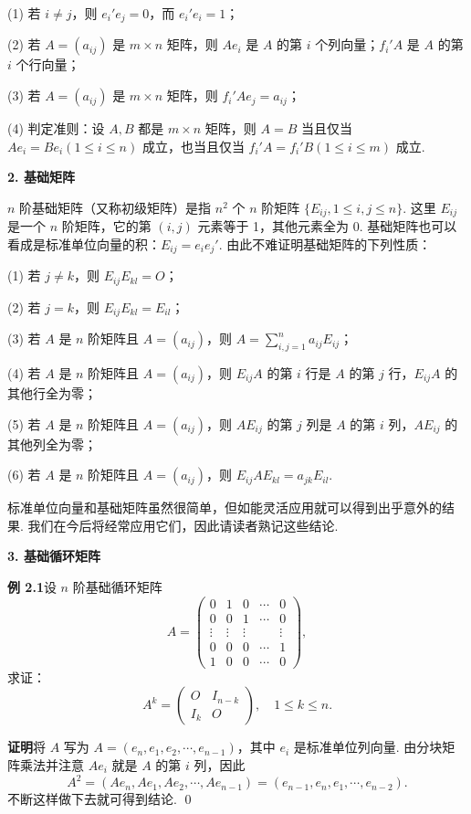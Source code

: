 \documentclass[UTF8,12pt,a4paper,fontset=fandol]{ctexart}
\begin{document}
(1) 若 $i\ne j$，则 $e_i'e_j=0$，而 $e_i'e_i=1$；

(2) 若 $A=(a_{ij})$ 是 $m\times n$ 矩阵，则 $Ae_i$ 是 $A$ 的第 $i$ 个列向量；$f_i'A$ 是 $A$ 的第 $i$ 个行向量；

(3) 若 $A=(a_{ij})$ 是 $m\times n$ 矩阵，则 $f_i'Ae_j=a_{ij}$；

(4) 判定准则：设 $A,B$ 都是 $m\times n$ 矩阵，则 $A=B$ 当且仅当 $Ae_i=Be_i(1\le i\le n)$ 成立，也当且仅当 $f_i'A=f_i'B(1\le i\le m)$ 成立.

\noindent\textbf{2. 基础矩阵}

$n$ 阶基础矩阵（又称初级矩阵）是指 $n^2$ 个 $n$ 阶矩阵 $\{E_{ij},1\le i,j\le n\}$. 这里 $E_{ij}$ 是一个 $n$ 阶矩阵，它的第 $(i,j)$ 元素等于 1，其他元素全为 0. 基础矩阵也可以看成是标准单位向量的积：$E_{ij}=e_ie_j'$. 由此不难证明基础矩阵的下列性质：

(1) 若 $j\ne k$，则 $E_{ij}E_{kl}=O$；

(2) 若 $j=k$，则 $E_{ij}E_{kl}=E_{il}$；

(3) 若 $A$ 是 $n$ 阶矩阵且 $A=(a_{ij})$，则 $A=\sum_{i,j=1}^n a_{ij}E_{ij}$；

(4) 若 $A$ 是 $n$ 阶矩阵且 $A=(a_{ij})$，则 $E_{ij}A$ 的第 $i$ 行是 $A$ 的第 $j$ 行，$E_{ij}A$ 的其他行全为零；

(5) 若 $A$ 是 $n$ 阶矩阵且 $A=(a_{ij})$，则 $AE_{ij}$ 的第 $j$ 列是 $A$ 的第 $i$ 列，$AE_{ij}$ 的其他列全为零；

(6) 若 $A$ 是 $n$ 阶矩阵且 $A=(a_{ij})$，则 $E_{ij}AE_{kl}=a_{jk}E_{il}$.

标准单位向量和基础矩阵虽然很简单，但如能灵活应用就可以得到出乎意外的结果. 我们在今后将经常应用它们，因此请读者熟记这些结论.

\noindent\textbf{3. 基础循环矩阵}

\noindent\textbf{例 2.1}\quad 设 $n$ 阶基础循环矩阵
\[
A=
\left(
\begin{array}{ccccc}
0 & 1 & 0 & \cdots & 0\\
0 & 0 & 1 & \cdots & 0\\
\vdots & \vdots & \vdots & & \vdots\\
0 & 0 & 0 & \cdots & 1\\
1 & 0 & 0 & \cdots & 0
\end{array}
\right),
\]
求证：
\[
A^k=
\left(
\begin{array}{cc}
O & I_{n-k}\\
I_k & O
\end{array}
\right),\quad 1\le k\le n.
\]

\noindent\textbf{证明}\quad 将 $A$ 写为 $A=(e_n,e_1,e_2,\cdots,e_{n-1})$，其中 $e_i$ 是标准单位列向量. 由分块矩阵乘法并注意 $Ae_i$ 就是 $A$ 的第 $i$ 列，因此
\[
A^2=(Ae_n,Ae_1,Ae_2,\cdots,Ae_{n-1})=(e_{n-1},e_n,e_1,\cdots,e_{n-2}).
\]
不断这样做下去就可得到结论. \qed
\end{document}
